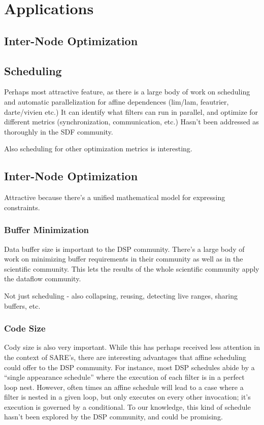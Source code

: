 \section{Applications}

\subsection{Inter-Node Optimization}

\subsection{Scheduling}

Perhaps most attractive feature, as there is a large body of work on
scheduling and automatic parallelization for affine dependences
(lim/lam, feautrier, darte/vivien etc.)  It can identify what filters
can run in parallel, and optimize for different metrics
(synchronization, communication, etc.)  Hasn't been addressed as
thoroughly in the SDF community.

Also scheduling for other optimization metrics is interesting.

\subsection{Inter-Node Optimization}

Attractive because there's a unified mathematical model for expressing
constraints.

\subsubsection{Buffer Minimization}

Data buffer size is important to the DSP community.  There's a large
body of work on minimizing buffer requirements in their community as
well as in the scientific community.  This lets the results of the
whole scientific community apply the dataflow community.

Not just scheduling - also collapsing, reusing, detecting live ranges,
sharing buffers, etc.

\subsubsection{Code Size}

Cody size is also very important.  While this has perhaps received
less attention in the context of SARE's, there are interesting
advantages that affine scheduling could offer to the DSP community.
For instance, most DSP schedules abide by a ``single appearance
schedule'' where the execution of each filter is in a perfect loop
nest.  However, often times an affine schedule will lead to a case
where a filter is nested in a given loop, but only executes on every
other invocation; it's execution is governed by a conditional.  To our
knowledge, this kind of schedule hasn't been explored by the DSP
community, and could be promising.

